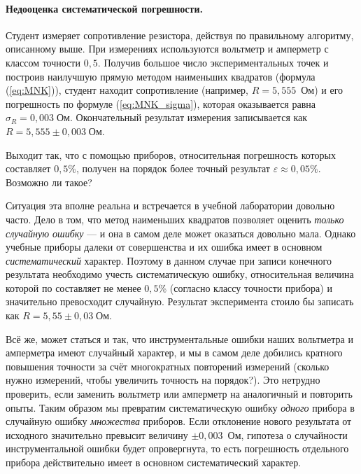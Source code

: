 \documentclass[10pt]{article}
\begin{document}
\paragraph{Недооценка систематической погрешности.}

Студент измеряет сопротивление резистора, действуя по правильному
алгоритму, описанному выше. При измерениях используются вольтметр
и амперметр с классом точности $0{,}5$. Получив большое число экспериментальных
точек и построив наилучшую прямую методом наименьших квадратов (формула
(\ref{eq:MNK})), студент находит сопротивление (например, $R=5{,}555$~Ом)
и его погрешность по формуле (\ref{eq:MNK_sigma}), которая оказывается
равна $\sigma_{R}=0{,}003\;\text{Ом}.$ Окончательный результат измерения
записывается как $R=5{,}555\pm0{,}003\;\text{Ом}$.

Выходит так, что с помощью приборов, относительная погрешность которых
составляет $0{,}5\%$, получен на порядок более точный результат $\varepsilon\approx0{,}05\%$.
Возможно ли такое?

{\footnotesize
Ситуация эта вполне реальна и встречается в учебной лаборатории довольно часто. Дело в
том, что метод наименьших квадратов позволяет оценить \emph{только
случайную ошибку} --- и она в самом деле может оказаться довольно мала. Однако
учебные приборы далеки от совершенства и их ошибка имеет в основном
\emph{систематический} характер. Поэтому в данном случае при записи конечного результата
необходимо учесть систематическую ошибку, относительная величина которой по составляет
не менее $0{,}5$\% (согласно классу точности прибора) и значительно превосходит
случайную. Результат эксперимента стоило бы записать как $R=5{,}55\pm0{,}03\;\text{Ом}$.

Всё же, может статься и так, что инструментальные
ошибки наших вольтметра и амперметра имеют случайный характер, и мы
в самом деле добились кратного повышения точности за счёт многократных
повторений измерений (сколько нужно измерений, чтобы увеличить точность
на порядок?). Это нетрудно проверить, если заменить вольтметр или
амперметр на аналогичный и повторить опыты. Таким образом мы превратим
систематическую ошибку \emph{одного} прибора в случайную ошибку \emph{множества} 
приборов. Если отклонение нового результата от исходного значительно
превысит величину $\pm0{,}003$~Ом, гипотеза о случайности инструментальной
ошибки будет опровергнута, то есть погрешность отдельного прибора
действительно имеет в основном систематический характер.\par
}%
\end{document}
